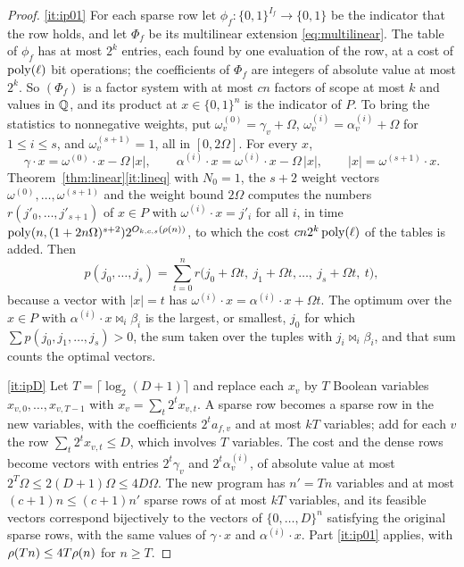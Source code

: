 \begin{proof}
\ref{it:ip01} For each sparse row let $\phi_f:\{0,1\}^{I_f}\to\{0,1\}$ be the
indicator that the row holds, and let $\Phi_f$ be its multilinear extension
\eqref{eq:multilinear}. The table of $\phi_f$ has at most $2^k$ entries, each
found by one evaluation of the row, at a cost of $\operatorname{poly}(\ell)$ bit operations;
the coefficients of $\Phi_f$ are integers of absolute value at most $2^k$. So
$(\Phi_f)$ is a factor system with at most $cn$ factors of scope at most $k$
and values in $\mathbb{Q}$, and its product at $x\in\{0,1\}^n$ is the indicator of $P$.
To bring the statistics to nonnegative weights, put
$\omega^{(0)}_v=\gamma_v+\Omega$, $\omega^{(i)}_v=\alpha^{(i)}_v+\Omega$ for
$1\le i\le s$, and $\omega^{(s+1)}_v=1$, all in $[0,2\Omega]$. For every $x$,
\[
  \gamma\cdot x=\omega^{(0)}\cdot x-\Omega\,|x|,\qquad
  \alpha^{(i)}\cdot x=\omega^{(i)}\cdot x-\Omega\,|x|,\qquad |x|=\omega^{(s+1)}\cdot x .
\]
Theorem~\ref{thm:linear}\ref{it:lineq} with $N_0=1$, the $s+2$ weight vectors
$\omega^{(0)},\dots,\omega^{(s+1)}$ and the weight bound $2\Omega$ computes the
numbers $r(j'_0,\dots,j'_{s+1})$ of $x\in P$ with $\omega^{(i)}\cdot x=j'_i$ for
all $i$, in time $\operatorname{poly}(n,(1+2n\Omega)^{s+2})2^{O_{k,c,s}(\rho(n))}$, to which
the cost $cn2^k\operatorname{poly}(\ell)$ of the tables is added. Then
\[
  p(j_0,\dots,j_s)=\sum_{t=0}^{n}r\bigl(j_0+\Omega t,\ j_1+\Omega t,\dots,\ j_s+\Omega t,\ t\bigr),
\]
because a vector with $|x|=t$ has $\omega^{(i)}\cdot x=\alpha^{(i)}\cdot x+\Omega t$.
The optimum over the $x\in P$ with $\alpha^{(i)}\cdot x\bowtie_i\beta_i$ is the
largest, or smallest, $j_0$ for which $\sum p(j_0,j_1,\dots,j_s)>0$, the sum
taken over the tuples with $j_i\bowtie_i\beta_i$, and that sum counts the
optimal vectors.

\ref{it:ipD} Let $T=\lceil\log_2(D+1)\rceil$ and replace each $x_v$ by $T$
Boolean variables $x_{v,0},\dots,x_{v,T-1}$ with $x_v=\sum_t2^tx_{v,t}$. A sparse
row becomes a sparse row in the new variables, with the coefficients
$2^ta_{f,v}$ and at most $kT$ variables; add for each $v$ the row
$\sum_t2^tx_{v,t}\le D$, which involves $T$ variables. The cost and the dense
rows become vectors with entries $2^t\gamma_v$ and $2^t\alpha^{(i)}_v$, of
absolute value at most $2^T\Omega\le2(D+1)\Omega\le4D\Omega$. The new program
has $n'=Tn$ variables and at most $(c+1)n\le(c+1)n'$ sparse rows of at most $kT$
variables, and its feasible vectors correspond bijectively to the vectors of
$\{0,\dots,D\}^n$ satisfying the original sparse rows, with the same values of
$\gamma\cdot x$ and $\alpha^{(i)}\cdot x$. Part \ref{it:ip01} applies, with
$\rho(Tn)\le4T\rho(n)$ for $n\ge T$.
\end{proof}

